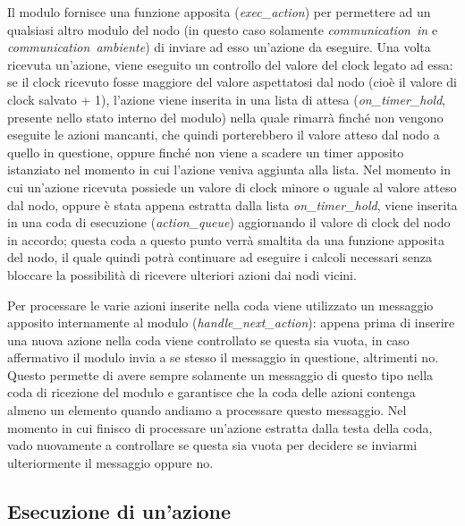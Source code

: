 \documentclass[italian]{memoir}
\begin{document}
Il modulo fornisce una funzione apposita (\textit{exec\_action}) per permettere ad un qualsiasi altro modulo del nodo (in questo caso solamente \textit{communication~in} e \textit{communication~ambiente}) di inviare ad esso un'azione da eseguire. Una volta ricevuta un'azione, viene eseguito un controllo del valore del clock legato ad essa: se il clock ricevuto fosse maggiore del valore aspettatosi dal nodo (cioè il valore di clock salvato + 1), l'azione viene inserita in una lista di attesa (\textit{on\_timer\_hold}, presente nello stato interno del modulo) nella quale rimarrà finché non vengono eseguite le azioni mancanti, che quindi porterebbero il valore atteso dal nodo a quello in questione, oppure finché non viene a scadere un timer apposito istanziato nel momento in cui l'azione veniva aggiunta alla lista. %
Nel momento in cui un'azione ricevuta possiede un valore di clock minore o uguale al valore atteso dal nodo, oppure è stata appena estratta dalla lista \textit{on\_timer\_hold}, viene inserita in una coda di esecuzione (\textit{action\_queue}) aggiornando il valore di clock del nodo in accordo; questa coda a questo punto verrà smaltita da una funzione apposita del nodo, il quale quindi potrà continuare ad eseguire i calcoli necessari senza bloccare la possibilità di ricevere ulteriori azioni dai nodi vicini. 

Per processare le varie azioni inserite nella coda viene utilizzato un messaggio apposito internamente al modulo (\textit{handle\_next\_action}): appena prima di inserire una nuova azione nella coda viene controllato se questa sia vuota, in caso affermativo il modulo invia a se stesso il messaggio in questione, altrimenti no. Questo permette di avere sempre solamente un messaggio di questo tipo nella coda di ricezione del modulo e garantisce che la coda delle azioni contenga almeno un elemento quando andiamo a processare questo messaggio. Nel momento in cui finisco di processare un'azione estratta dalla testa della coda, vado nuovamente a controllare se questa sia vuota per decidere se inviarmi ulteriormente il messaggio oppure no.


\subsection{Esecuzione di un'azione}
\end{document}

